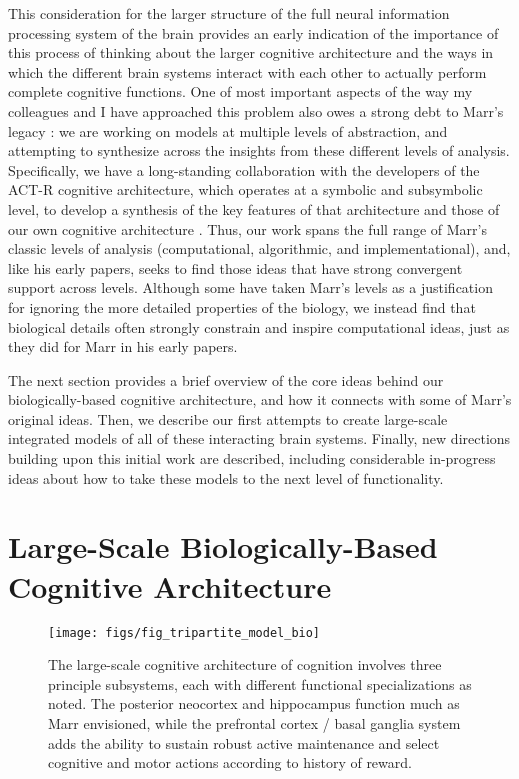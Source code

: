 \documentclass[11pt,twoside]{article}
\newif\myifpdf
\begin{document}
This consideration for the larger structure of the full neural information processing system of the brain provides an early indication of the importance of this process of thinking about the larger cognitive architecture and the ways in which the different brain systems interact with each other to actually perform complete cognitive functions.  One of most important aspects of the way my colleagues and I have approached this problem also owes a strong debt to Marr's legacy \cite{Marr82}: we are working on models at multiple levels of abstraction, and attempting to synthesize across the insights from these different levels of analysis.  Specifically, we have a long-standing collaboration with the developers of the ACT-R cognitive architecture, which operates at a symbolic and subsymbolic level, to develop a synthesis of the key features of that architecture and those of our own cognitive architecture \cite{JilkLebiereOReillyEtAl08}.  Thus, our work spans the full range of Marr's classic levels of analysis (computational, algorithmic, and implementational), and, like his early papers, seeks to find those ideas that have strong convergent support across levels.  Although some have taken Marr's levels as a justification for ignoring the more detailed properties of the biology, we instead find that biological details often strongly constrain and inspire computational ideas, just as they did for Marr in his early papers.

The next section provides a brief overview of the core ideas behind our biologically-based cognitive architecture, and how it connects with some of Marr's original ideas.  Then, we describe our first attempts to create large-scale integrated models of all of these interacting brain systems.  Finally, new directions building upon this initial work are described, including considerable in-progress ideas about how to take these models to the next level of functionality.

\section{Large-Scale Biologically-Based Cognitive Architecture}

\begin{figure}
  \centering\texttt{[image: figs/fig\_tripartite\_model\_bio]}
  \caption{\small The large-scale cognitive architecture of cognition involves three principle subsystems, each with different functional specializations as noted.  The posterior neocortex and hippocampus function much as Marr envisioned, while the prefrontal cortex / basal ganglia system adds the ability to sustain robust active maintenance and select cognitive and motor actions according to history of reward.}
  \label{fig.bio_arch}
\end{figure}
\end{document}
